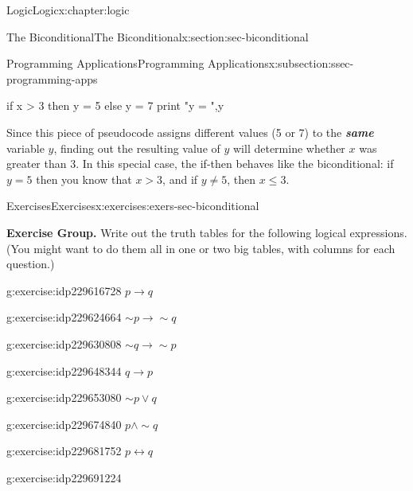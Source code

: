 \documentclass[twoside,10pt,]{book}
\newcommand{\alert}[1]{\textbf{\textit{#1}}}
\numberwithin{equation}{section}
\newcommand{\conditional}{{p {\rightarrow} q}}
\newcommand{\inverse}{{\sim\!{p}{} {\rightarrow} \sim\!{q}{}}}
\newcommand{\converse}{{q {\rightarrow} p}}
\newcommand{\contrapositive}{{\sim\!{q}{} {\rightarrow} \sim\!{p}{}}}
\newcommand{\biconditional}{{p {\leftrightarrow}{} q}}
\newcommand{\gt}{>}
\begin{document}
\begin{chapterptx}{Logic}{}{Logic}{}{}{x:chapter:logic}
\begin{sectionptx}{The Biconditional}{}{The Biconditional}{}{}{x:section:sec-biconditional}
\begin{subsectionptx}{Programming Applications}{}{Programming Applications}{}{}{x:subsection:ssec-programming-apps}
\begin{codedisplay}
              if x > 3 then
                y = 5
              else
                y = 7
              print "y = ",y
            
\end{codedisplay}
Since this piece of pseudocode assigns different values (5 or 7) to the \alert{same} variable \(y\), finding out the resulting value of \(y\) will determine whether \(x\) was greater than 3.  In this special case, the if-then behaves like the biconditional: if \(y=5\) then you know that \(x \gt 3\), and if \(y\ne 5\), then \(x\leq 3\).%
\end{subsectionptx}
%
%
\typeout{************************************************}
\typeout{************************************************}
%
\begin{exercises-subsection}{Exercises}{}{Exercises}{}{}{x:exercises:exers-sec-biconditional}
\par\medskip\noindent%
\textbf{Exercise Group.}\space\space%
Write out the truth tables for the following logical expressions.  (You might want to do them all in one or two big tables, with columns for each question.)\begin{exercisegroup}
\begin{divisionexerciseeg}{1}{}{}{g:exercise:idp229616728}%
\(\conditional\)\end{divisionexerciseeg}%
\begin{divisionexerciseeg}{2}{}{}{g:exercise:idp229624664}%
\(\inverse\)\end{divisionexerciseeg}%
\begin{divisionexerciseeg}{3}{}{}{g:exercise:idp229630808}%
\(\contrapositive\)\end{divisionexerciseeg}%
\begin{divisionexerciseeg}{4}{}{}{g:exercise:idp229648344}%
\(\converse \)\end{divisionexerciseeg}%
\begin{divisionexerciseeg}{5}{}{}{g:exercise:idp229653080}%
\(\sim\!{p}{\vee} q \)\end{divisionexerciseeg}%
\begin{divisionexerciseeg}{6}{}{}{g:exercise:idp229674840}%
\(p{\wedge}\sim\!{q} \)\end{divisionexerciseeg}%
\begin{divisionexerciseeg}{7}{}{}{g:exercise:idp229681752}%
\(\biconditional \)\end{divisionexerciseeg}%
\begin{divisionexerciseeg}{8}{}{}{g:exercise:idp229691224}%

\end{divisionexerciseeg}
\end{exercisegroup}
\end{exercises-subsection}
\end{sectionptx}
\end{chapterptx}
\end{document}
